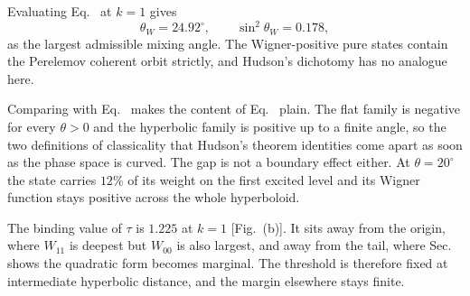 \documentclass[aps,prl,reprint,superscriptaddress,nofootinbib]{revtex4-2}
\begin{document}
Evaluating Eq.~ at $k=1$ gives
\begin{equation}
\theta_W=24.92^\circ,\qquad \sin^2\theta_W=0.178,
\label{eq:thetaW}
\end{equation}
as the largest admissible mixing angle. The Wigner-positive pure states contain the Perelemov coherent orbit strictly, and Hudson's dichotomy has no analogue here.

Comparing with Eq.~ makes the content of Eq.~ plain. The flat family is negative for every $\theta>0$ and the hyperbolic family is positive up to a finite angle, so the two definitions of classicality that Hudson's theorem identities come apart as soon as the phase space is curved. The gap is not a boundary effect either. At $\theta=20^\circ$ the state carries $12\%$ of its weight on the first excited level and its Wigner function stays positive across the whole hyperboloid.

The binding value of $\tau$ is $1.225$ at $k=1$ [Fig.~(b)]. It sits away from the origin, where $W_{11}$ is deepest but $W_{00}$ is also largest, and away from the tail, where Sec.~ shows the quadratic form becomes marginal. The threshold is therefore fixed at intermediate hyperbolic distance, and the margin elsewhere stays finite.
\end{document}
